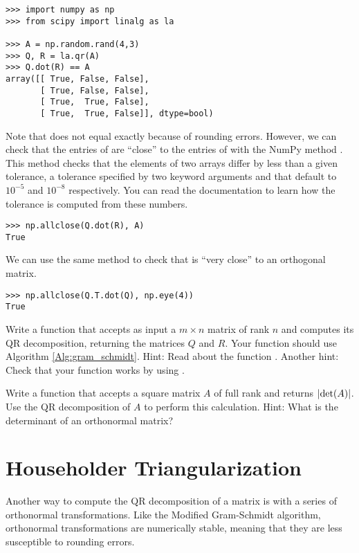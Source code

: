 \begin{lstlisting}
>>> import numpy as np
>>> from scipy import linalg as la

>>> A = np.random.rand(4,3)
>>> Q, R = la.qr(A)
>>> Q.dot(R) == A                      
array([[ True, False, False],
       [ True, False, False],
       [ True,  True, False],
       [ True,  True, False]], dtype=bool)
\end{lstlisting}
 Note that  does not equal  exactly because of rounding errors. 
 However, we can check that the entries of  are ``close'' to the entries of  with the NumPy method . 
 This method checks that the elements of two arrays differ by less than a given tolerance, a tolerance specified by two keyword arguments  and  that default to $10^{-5}$ and $10^{-8}$ respectively. 
 You can read the documentation to learn how the tolerance is computed from these numbers.
\begin{lstlisting}
>>> np.allclose(Q.dot(R), A) 
True
\end{lstlisting}
We can use the same method to check that  is ``very close'' to an orthogonal matrix.
\begin{lstlisting}
>>> np.allclose(Q.T.dot(Q), np.eye(4)) 
True
\end{lstlisting}


\begin{problem}
\label{prob:QR}
Write a function that accepts as input a $m \times n$ matrix of rank $n$ and computes its QR decomposition, returning the matrices $Q$ and $R$. 
Your function should use Algorithm \ref{Alg:gram_schmidt}. 
Hint: Read about the function .
Another hint: Check that your function works by using .
\end{problem}

\begin{problem}
Write a function that accepts a square matrix $A$ of full rank and returns $\left\lvert\det(A)\right\rvert$. 
Use the QR decomposition of $A$ to perform this calculation.
Hint: What is the determinant of an orthonormal matrix?
\end{problem}

\section*{Householder Triangularization}
Another way to compute the QR decomposition of a matrix is with a series of orthonormal transformations. 
Like the Modified Gram-Schmidt algorithm, orthonormal transformations are numerically stable, meaning that they are less susceptible to rounding errors.

